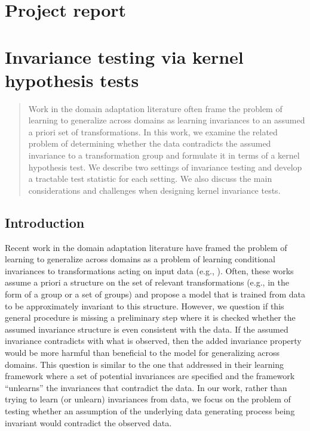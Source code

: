 

\section{Project report}
\vspace{1em}

\section*{Invariance testing via kernel hypothesis tests}
\vspace{1em}

\begin{abstract}
Work in the domain adaptation literature often frame the problem of learning to generalize across domains as learning invariances to an assumed a priori set of transformations. In this work, we examine the related problem of determining whether the data contradicts the assumed invariance to a transformation group and formulate it in terms of a kernel hypothesis test. We describe two settings of invariance testing and develop a tractable test statistic for each setting. We also discuss the main considerations and challenges when designing kernel invariance tests.
\end{abstract}


\subsection{Introduction}

Recent work in the domain adaptation literature have framed the problem of learning to generalize across domains as a problem of learning conditional invariances to transformations acting on input data (e.g., \parencite{Gu:2019,Chen:2020:scm,Schwobel:2021}). Often, these works assume a priori a structure on the set of relevant transformations (e.g., in the form of a group or a set of groups) and propose a model that is trained from data to be approximately invariant to this structure. However, we question if this general procedure is missing a preliminary step where it is checked whether the assumed invariance structure is even consistent with the data. If the assumed invariance contradicts with what is observed, then the added invariance property would be more harmful than beneficial to the model for generalizing across domains. This question is similar to the one that \textcite{Mouli:2021} addressed in their learning framework where a set of potential invariances are specified and the framework ``unlearns'' the invariances that contradict the data. In our work, rather than trying to learn (or unlearn) invariances from data, we focus on the problem of testing whether an assumption of the underlying data generating process being invariant would contradict the observed data.
\\

